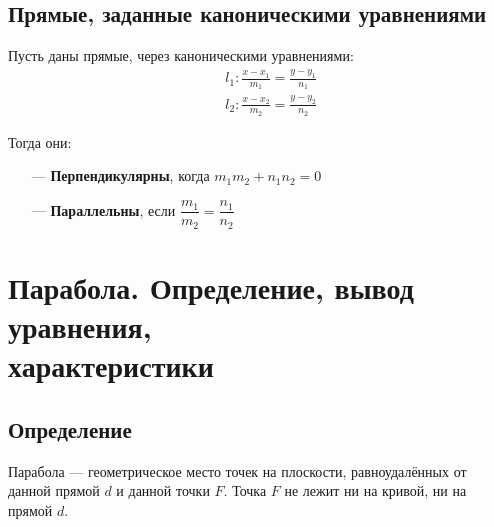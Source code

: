 \documentclass[12pt, fleqn]{extarticle}
\begin{document}
\subsection*{Прямые, заданные каноническими уравнениями}
Пусть даны прямые, через каноническими уравнениями:
\begin{align*}
     &  &
    l_1: \frac{x - x_1}{m_1} = \frac{y - y_1}{n_1} \\
     &  &
    l_2: \frac{x - x_2}{m_2} = \frac{y - y_2}{n_2}
\end{align*}

Тогда они:
\begin{itemize}
    \item[—]{\textbf{Перпендикулярны}, когда \(m_1m_2 + n_1n_2 = 0\)}
    \item[—]{\textbf{Параллельны}, если \(\dfrac{m_1}{m_2} = \dfrac{n_1}{n_2}\)}
\end{itemize}







\newpage

\section{Парабола. Определение, вывод уравнения,\\ характеристики}\label{sec:parabola}

\subsection*{Определение}
Парабола — геометрическое место точек на плоскости, равноудалённых от данной прямой \(d\) и данной точки \(F\).
Точка \(F\) не лежит ни на кривой, ни на прямой \(d\).
\end{document}
